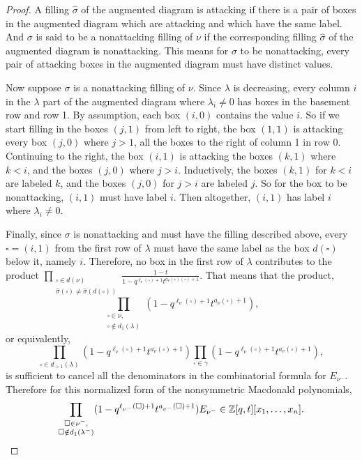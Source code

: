 \documentclass[11pt]{article}
\theoremstyle{definition}
\numberwithin{equation}{section}
\newcommand{\numin}{{\nu^-}}
\newcommand{\legnu}{{\ell_\nu(\square)}}
\newcommand{\legnumin}{{\ell_{\nu^-}(\square)}}
\newcommand{\armtwonu}{{a_\nu(\square)}}
\newcommand{\armtwonumin}{{a_{\nu^-}(\square)}}
\newcommand{\nonsymmetricprod}{\prod\limits_{\square \in \gamma}}
\newcommand{\dg}{d}
\begin{document}
\begin{proof}
A filling $\widehat{\sigma}$ of the augmented diagram is attacking if there is a pair of boxes in the augmented diagram which are attacking and which have the same label. And $\sigma$ is said to be a nonattacking filling of $\nu$ if the corresponding filling $\widehat{\sigma}$ of the augmented diagram is nonattacking. This means for $\sigma$ to be nonattacking, every pair of attacking boxes in the augmented diagram must have distinct values.

Now suppose $\sigma$ is a nonattacking filling of $\nu$. Since $\lambda$ is decreasing, every column $i$ in the $\lambda$ part of the augmented diagram where $\lambda_i \neq 0$ has boxes in the basement row and row 1. By assumption, each box $(i,0)$ contains the value $i$. So if we start filling in the boxes $(j,1)$ from left to right, the box $(1,1)$ is attacking every box $(j,0)$ where $j>1$, all the boxes to the right of column 1 in row 0. Continuing to the right, the box $(i,1)$ is attacking the boxes $(k,1)$ where $k<i$, and the boxes $(j,0)$ where $j>i$. Inductively, the boxes $(k,1)$ for $k<i$ are labeled $k$, and the boxes $(j,0)$ for $j>i$ are labeled $j$. So for the box to be nonattacking, $(i,1)$ must have label $i$. Then altogether, $(i,1)$ has label $i$ where $\lambda_i \neq 0$.

Finally, since $\sigma$ is nonattacking and must have the filling described above, every $\square = (i,1)$ 
from the first row of $\lambda$ must have the same label as the box $d(\square)$ below it, namely $i$.
Therefore, no box in the first row of $\lambda$ contributes to the product $\displaystyle{\prod\limits_{\substack{\square \in  \dg(\nu) \\ \widehat{\sigma}(\square) \neq \widehat{\sigma}(d(\square))}}} \frac{1-t}{1-q^{\legnu+1} t^{\armtwonu(\square)+1}}$. That means that the product, \[ \prod\limits_{\substack{\square \in \nu, \\ \square \notin d_1(\lambda) }}(1-q^{\legnu+1}t^{\armtwonu + 1}),\] or equivalently, \[\prod\limits_{\square \in d_{>1}(\lambda) }(1-q^{\legnu+1}t^{\armtwonu + 1}) \nonsymmetricprod(1-q^{\legnu+1}t^{\armtwonu + 1}),\] is sufficient to cancel all the denominators in the combinatorial formula for $E_\numin$. Therefore for this normalized form of the nonsymmetric Macdonald polynomials, \[\prod\limits_{\substack{\square \in \numin, \\ \square \notin d_1(\lambda^-) }}(1-q^{\legnumin+1}t^{\armtwonumin + 1}) E_\numin \in \mathbb{Z}[q,t][x_1,\dotsc,x_n].\qedhere\]
\end{proof}
\end{document}
